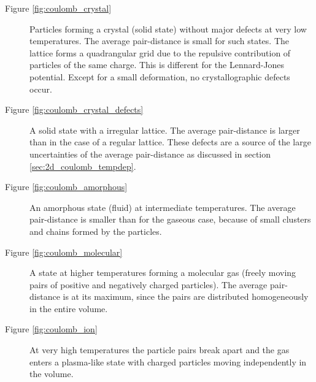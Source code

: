 \documentclass[11pt, a4paper]{article}
\numberwithin{equation}{section}
\begin{document}
\begin{description}
	\item[Figure \ref{fig:coulomb_crystal}]
		Particles forming a crystal (solid state) without major defects at very low temperatures.
		The average pair-distance is small for such states.
		The lattice forms a quadrangular grid due to the repulsive contribution of particles of the same charge.
		This is different for the Lennard-Jones potential.
		Except for a small deformation, no crystallographic defects occur.
	
	\item[Figure \ref{fig:coulomb_crystal_defects}]
		A solid state with a irregular lattice.
		The average pair-distance is larger than in the case of a regular lattice.
		These defects are a source of the large uncertainties of the average pair-distance as discussed in section \ref{sec:2d_coulomb_tempdep}.
	
	\item[Figure \ref{fig:coulomb_amorphous}]
		An amorphous state (fluid) at intermediate temperatures.
		The average pair-distance is smaller than for the gaseous case, because of small clusters and chains formed by the particles.
		
	\item[Figure \ref{fig:coulomb_molecular}] 
		A state at higher temperatures forming a molecular gas (freely moving pairs of positive and negatively charged particles).
		The average pair-distance is at its maximum, since the pairs are distributed homogeneously in the entire volume.
	
	\item[Figure \ref{fig:coulomb_ion}]
		At very high temperatures the particle pairs break apart and the gas enters a plasma-like state with charged particles moving independently in the volume.
		
\end{description}
\end{document}
